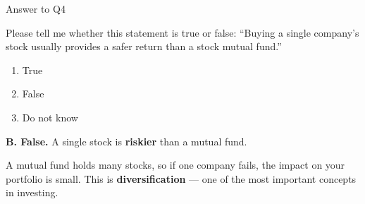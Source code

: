 \documentclass[9pt,english,aspectratio=169]{beamer}
\begin{document}







\begin{frame}{Answer to Q4}

  \begin{questionbox}
    Please tell me whether this statement is true or false: ``Buying a single
    company's stock usually provides a safer return than a stock mutual fund.''
  \end{questionbox}

  \vspace{0.5em}
  \begin{enumerate}
    \item True
    \item False
    \item Do not know
  \end{enumerate}

  \pause
  \vspace{0.5em}
  \begin{answerbox}
    \textbf{B. False.} A single stock is \textbf{riskier} than a mutual fund.

    \vspace{0.3em}
    A mutual fund holds many stocks, so if one company fails, the impact on
    your portfolio is small. This is \textbf{diversification} --- one of the most
    important concepts in investing.
  \end{answerbox}

\end{frame}
\end{document}
